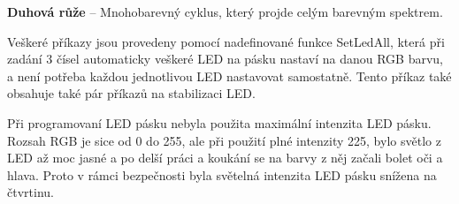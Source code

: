 \textbf{Duhová růže} – Mnohobarevný cyklus, který projde celým barevným spektrem. 

Veškeré příkazy jsou provedeny pomocí nadefinované funkce SetLedAll, která při zadání 3 čísel automaticky veškeré LED na pásku nastaví na danou RGB barvu, a není potřeba každou jednotlivou LED nastavovat samostatně. Tento příkaz také obsahuje také pár příkazů na stabilizaci LED.

Při programovaní LED pásku nebyla použita maximální intenzita LED pásku. Rozsah RGB je sice od 0 do 255, ale při použití plné intenzity 225, bylo světlo z LED až moc jasné a po delší práci a koukání se na barvy z něj začali bolet oči a hlava. Proto v rámci bezpečnosti byla světelná intenzita LED pásku snížena na čtvrtinu. 
\newpage